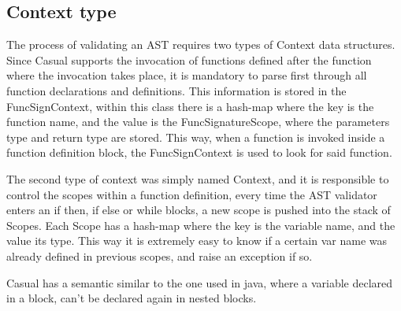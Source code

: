 \documentclass[12pt]{article}
\begin{document}
\newpage

\subsection{Context type}
The process of validating an AST requires two types of Context data structures. Since Casual supports the invocation of functions defined after the function where the invocation takes place, it is mandatory to parse first through all function declarations and definitions. This information is stored in the FuncSignContext, within this class there is a hash-map where the key is the function name, and the value is the FuncSignatureScope, where the parameters type and return type are stored. This way, when a function is invoked inside a function definition block, the FuncSignContext is used to look for said function.

The second type of context was simply named Context, and it is responsible to control the scopes within a function definition, every time the AST validator enters an if then, if else or while blocks, a new scope is pushed into the stack of Scopes. Each Scope has a hash-map where the key is the variable name, and the value its type. This way it is extremely easy to know if a certain var name was already defined in previous scopes, and raise an exception if so.

Casual has a semantic similar to the one used in java, where a variable declared in a block, can't be declared again in nested blocks.


\end{document}
